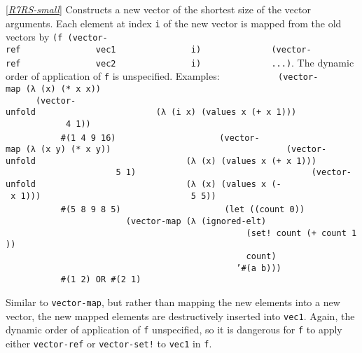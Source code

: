 \begin{entry}{%
  }

  {[}\protect\hyperlink{R7RS-small}{\emph{R7RS-small}}{]}
  Constructs a new vector of the shortest size of the vector
  arguments. Each element at index \texttt{i} of the new vector is
  mapped from the old vectors by
  \texttt{(f~(vector-ref~~~~~~~~~~~~~~~vec1~~~~~~~~~~~~~~~i)~~~~~~~~~~~~~~(vector-ref~~~~~~~~~~~~~~~vec2~~~~~~~~~~~~~~~i)~~~~~~~~~~~~~~...)}.
  The dynamic order of application of \texttt{f} is unspecified.
  Examples:
  \texttt{~~~~~~~~~~~(vector-map~(λ~(x)~(*~x~x))~~~~~~~~~~~~~~~~~~~~~~~~~~~~~~~~~~~~~~~~~~~~~~~~~~~~~~~~~(vector-unfold~~~~~~~~~~~~~~~~~~~~~~~~(λ~(i~x)~(values~x~(+~x~1)))~~~~~~~~~~~~~~~~~~~~~~~~4~1))~~~~~~~~~}\\
  \texttt{~~~~~~~~~~~\#(1~4~9~16)~~~~~~~~~}
  \texttt{~~~~~~~~~~~(vector-map~(λ~(x~y)~(*~x~y))~~~~~~~~~~~~~~~~~~~~~~~~~~~~~~~~~~~(vector-unfold~~~~~~~~~~~~~~~~~~~~~~~~~~~~~~(λ~(x)~(values~x~(+~x~1)))~~~~~~~~~~~~~~~~~~~~~~~~~~~~~~5~1)~~~~~~~~~~~~~~~~~~~~~~~~~~~~~~~~~~~(vector-unfold~~~~~~~~~~~~~~~~~~~~~~~~~~~~~~(λ~(x)~(values~x~(-~x~1)))~~~~~~~~~~~~~~~~~~~~~~~~~~~~~~5~5))~~~~~~~~~}\\
  \texttt{~~~~~~~~~~~\#(5~8~9~8~5)~~~~~~~~~}
  \texttt{~~~~~~~~~~~(let~((count~0))~~~~~~~~~}\\
  \texttt{~~~~~~~~~~~~~~~~~~~~~~~~(vector-map~(λ~(ignored-elt)~~~~~~~~~}\\
  \texttt{~~~~~~~~~~~~~~~~~~~~~~~~~~~~~~~~~~~~~~~~~~~~~~~~(set!~count~(+~count~1))~~~~~~~~~}\\
  \texttt{~~~~~~~~~~~~~~~~~~~~~~~~~~~~~~~~~~~~~~~~~~~~~~~~count)~~~~~~~~~}\\
  \texttt{~~~~~~~~~~~~~~~~~~~~~~~~~~~~~~~~~~~~~~~~~~~~~~'\#(a~b)))~~~~~~~~~}\\
  \texttt{~~~~~~~~~~~\#(1~2)~OR~\#(2~1)~~~~~~~~~}
\end{entry}

\begin{entry}{%
  }

  Similar to \texttt{vector-map}, but rather than
  mapping the new elements into a new vector, the new mapped elements
  are destructively inserted into \texttt{vec1}. Again, the dynamic
  order of application of \texttt{f} unspecified, so it is dangerous
  for \texttt{f} to apply either \texttt{vector-ref} or
  \texttt{vector-set!} to \texttt{vec1} in
  \texttt{f}.\\
\end{entry}

